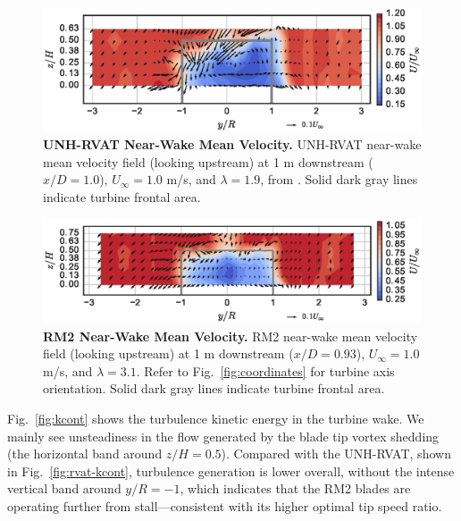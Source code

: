 \documentclass[10pt,letterpaper]{article}
\begin{document}
\begin{figure}
    \includegraphics[width=\textwidth]{figures/RVAT-Re-dep-meancontquiv_10.eps}

    \caption{{\bf UNH-RVAT Near-Wake Mean Velocity.} UNH-RVAT near-wake mean
        velocity field (looking upstream) at 1 m downstream ($x/D=1.0$),
        $U_\infty=1.0$ m/s, and $\lambda=1.9$, from \cite{Bachant2016-Energies}.
        Solid dark gray lines indicate turbine frontal area.}

    \label{fig:rvat-meancontquiv}
\end{figure}

\begin{figure}
    \includegraphics[width=\textwidth]{figures/meancontquiv.eps}

    \caption{{\bf RM2 Near-Wake Mean Velocity.} RM2 near-wake mean velocity
        field (looking upstream) at 1 m downstream ($x/D=0.93$), $U_\infty=1.0$ m/s,
        and $\lambda=3.1$. Refer to Fig.~\ref{fig:coordinates} for turbine axis
        orientation. Solid dark gray lines indicate turbine frontal area.}

    \label{fig:meancontquiv}
\end{figure}

Fig.~\ref{fig:kcont} shows the turbulence kinetic energy in the turbine wake. We
mainly see unsteadiness in the flow generated by the blade tip vortex shedding
(the horizontal band around $z/H=0.5$). Compared with the UNH-RVAT, shown in
Fig.~\ref{fig:rvat-kcont}, turbulence generation is lower overall, without the
intense vertical band around $y/R=-1$, which indicates that the RM2 blades are
operating further from stall---consistent with its higher optimal tip speed
ratio.
\end{document}

